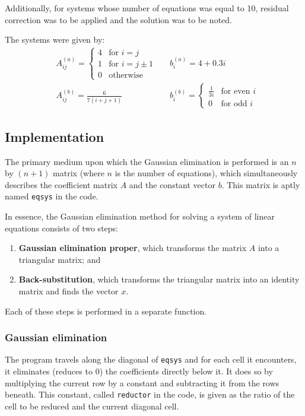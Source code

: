 \documentclass{article}
\begin{document}
	Additionally, for systems whose number of equations was equal to 10,
	residual correction was to be applied and the solution was to be noted.
	
	The systems were given by:
	\begin{align*}
		&A_{ij}^{(a)} =
		\begin{cases} 
			4 & \text{for } i = j \\
			1 & \text{for } i = j \pm 1 \\
			0 & \text{otherwise}
		\end{cases}
		&&
		b_i^{(a)} = 4 + 0.3i
		\\
		&A_{ij}^{(b)} = \frac{6}{7(i + j + 1)}
		&&
		b_i^{(b)} =
		\begin{cases} 
			\frac{1}{3i} & \text{for even } i\\
			0 & \text{for odd } i
		\end{cases}
	\end{align*}
	
	\subsection{Implementation}
	
	The primary medium upon which the Gaussian elimination is performed is an
	$n$ by $(n + 1)$ matrix (where $n$ is the number of equations), which
	simultaneously describes the coefficient matrix $A$ and the constant vector
	$b$. This matrix is aptly named \texttt{eqsys} in the code.
	
	In essence, the Gaussian elimination method for solving a system of linear
	equations consists of two steps:
	
	\begin{enumerate}
		\item \textbf{Gaussian elimination proper}, which transforms the
		matrix $A$ into a triangular matrix; and
		\item \textbf{Back-substitution}, which transforms the triangular
		matrix into an identity matrix and finds the vector $x$.
	\end{enumerate}
	
	Each of these steps is performed in a separate function.
	
	\subsubsection{Gaussian elimination}
	
	The program travels along the diagonal of \texttt{eqsys} and for each cell
	it encounters, it eliminates (reduces to $0$) the coefficients directly
	below it. It does so by multiplying the current row by a constant and
	subtracting it from the rows beneath. This constant, called
	\texttt{reductor} in the code, is given as the ratio of the cell to be
	reduced and the current diagonal cell.
	
\end{document}
